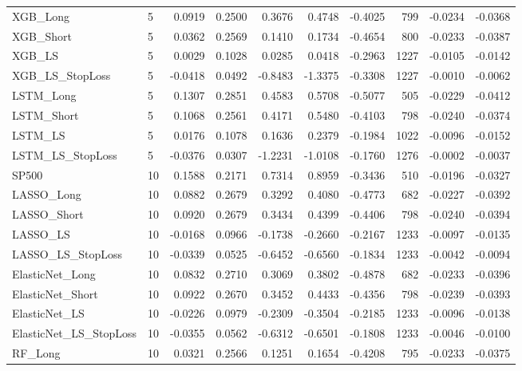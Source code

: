 \begin{tabular}{llrrrrrrrr}
\cline{1-10}
XGB\_Long & 5 & 0.0919 & 0.2500 & 0.3676 & 0.4748 & -0.4025 & 799 & -0.0234 & -0.0368 \\
\cline{1-10}
XGB\_Short & 5 & 0.0362 & 0.2569 & 0.1410 & 0.1734 & -0.4654 & 800 & -0.0233 & -0.0387 \\
\cline{1-10}
XGB\_LS & 5 & 0.0029 & 0.1028 & 0.0285 & 0.0418 & -0.2963 & 1227 & -0.0105 & -0.0142 \\
\cline{1-10}
XGB\_LS\_StopLoss & 5 & -0.0418 & 0.0492 & -0.8483 & -1.3375 & -0.3308 & 1227 & -0.0010 & -0.0062 \\
\cline{1-10}
LSTM\_Long & 5 & 0.1307 & 0.2851 & 0.4583 & 0.5708 & -0.5077 & 505 & -0.0229 & -0.0412 \\
\cline{1-10}
LSTM\_Short & 5 & 0.1068 & 0.2561 & 0.4171 & 0.5480 & -0.4103 & 798 & -0.0240 & -0.0374 \\
\cline{1-10}
LSTM\_LS & 5 & 0.0176 & 0.1078 & 0.1636 & 0.2379 & -0.1984 & 1022 & -0.0096 & -0.0152 \\
\cline{1-10}
LSTM\_LS\_StopLoss & 5 & -0.0376 & 0.0307 & -1.2231 & -1.0108 & -0.1760 & 1276 & -0.0002 & -0.0037 \\
\cline{1-10}
SP500 & 10 & 0.1588 & 0.2171 & 0.7314 & 0.8959 & -0.3436 & 510 & -0.0196 & -0.0327 \\
\cline{1-10}
LASSO\_Long & 10 & 0.0882 & 0.2679 & 0.3292 & 0.4080 & -0.4773 & 682 & -0.0227 & -0.0392 \\
\cline{1-10}
LASSO\_Short & 10 & 0.0920 & 0.2679 & 0.3434 & 0.4399 & -0.4406 & 798 & -0.0240 & -0.0394 \\
\cline{1-10}
LASSO\_LS & 10 & -0.0168 & 0.0966 & -0.1738 & -0.2660 & -0.2167 & 1233 & -0.0097 & -0.0135 \\
\cline{1-10}
LASSO\_LS\_StopLoss & 10 & -0.0339 & 0.0525 & -0.6452 & -0.6560 & -0.1834 & 1233 & -0.0042 & -0.0094 \\
\cline{1-10}
ElasticNet\_Long & 10 & 0.0832 & 0.2710 & 0.3069 & 0.3802 & -0.4878 & 682 & -0.0233 & -0.0396 \\
\cline{1-10}
ElasticNet\_Short & 10 & 0.0922 & 0.2670 & 0.3452 & 0.4433 & -0.4356 & 798 & -0.0239 & -0.0393 \\
\cline{1-10}
ElasticNet\_LS & 10 & -0.0226 & 0.0979 & -0.2309 & -0.3504 & -0.2185 & 1233 & -0.0096 & -0.0138 \\
\cline{1-10}
ElasticNet\_LS\_StopLoss & 10 & -0.0355 & 0.0562 & -0.6312 & -0.6501 & -0.1808 & 1233 & -0.0046 & -0.0100 \\
\cline{1-10}
RF\_Long & 10 & 0.0321 & 0.2566 & 0.1251 & 0.1654 & -0.4208 & 795 & -0.0233 & -0.0375 \\

\end{tabular}

